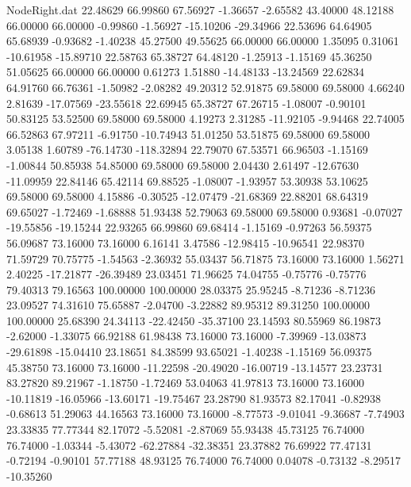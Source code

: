 \begin{filecontents}{NodeRight.dat}
  22.48629   66.99860   67.56927    -1.36657   -2.65582   43.40000   48.12188   66.00000   66.00000   -0.99860   -1.56927  -15.10206  -29.34966
  22.53696   64.64905   65.68939    -0.93682   -1.40238   45.27500   49.55625   66.00000   66.00000    1.35095    0.31061  -10.61958  -15.89710
  22.58763   65.38727   64.48120    -1.25913   -1.15169   45.36250   51.05625   66.00000   66.00000    0.61273    1.51880  -14.48133  -13.24569
  22.62834   64.91760   66.76361    -1.50982   -2.08282   49.20312   52.91875   69.58000   69.58000    4.66240    2.81639  -17.07569  -23.55618
  22.69945   65.38727   67.26715    -1.08007   -0.90101   50.83125   53.52500   69.58000   69.58000    4.19273    2.31285  -11.92105   -9.94468
  22.74005   66.52863   67.97211    -6.91750  -10.74943   51.01250   53.51875   69.58000   69.58000    3.05138    1.60789  -76.14730 -118.32894
  22.79070   67.53571   66.96503    -1.15169   -1.00844   50.85938   54.85000   69.58000   69.58000    2.04430    2.61497  -12.67630  -11.09959
  22.84146   65.42114   69.88525    -1.08007   -1.93957   53.30938   53.10625   69.58000   69.58000    4.15886   -0.30525  -12.07479  -21.68369
  22.88201   68.64319   69.65027    -1.72469   -1.68888   51.93438   52.79063   69.58000   69.58000    0.93681   -0.07027  -19.55856  -19.15244
  22.93265   66.99860   69.68414    -1.15169   -0.97263   56.59375   56.09687   73.16000   73.16000    6.16141    3.47586  -12.98415  -10.96541
  22.98370   71.59729   70.75775    -1.54563   -2.36932   55.03437   56.71875   73.16000   73.16000    1.56271    2.40225  -17.21877  -26.39489
  23.03451   71.96625   74.04755    -0.75776   -0.75776   79.40313   79.16563  100.00000  100.00000   28.03375   25.95245   -8.71236   -8.71236
  23.09527   74.31610   75.65887    -2.04700   -3.22882   89.95312   89.31250  100.00000  100.00000   25.68390   24.34113  -22.42450  -35.37100
  23.14593   80.55969   86.19873    -2.62000   -1.33075   66.92188   61.98438   73.16000   73.16000   -7.39969  -13.03873  -29.61898  -15.04410
  23.18651   84.38599   93.65021    -1.40238   -1.15169   56.09375   45.38750   73.16000   73.16000  -11.22598  -20.49020  -16.00719  -13.14577
  23.23731   83.27820   89.21967    -1.18750   -1.72469   53.04063   41.97813   73.16000   73.16000  -10.11819  -16.05966  -13.60171  -19.75467
  23.28790   81.93573   82.17041    -0.82938   -0.68613   51.29063   44.16563   73.16000   73.16000   -8.77573   -9.01041   -9.36687   -7.74903
  23.33835   77.77344   82.17072    -5.52081   -2.87069   55.93438   45.73125   76.74000   76.74000   -1.03344   -5.43072  -62.27884  -32.38351
  23.37882   76.69922   77.47131    -0.72194   -0.90101   57.77188   48.93125   76.74000   76.74000    0.04078   -0.73132   -8.29517  -10.35260

\end{filecontents}
